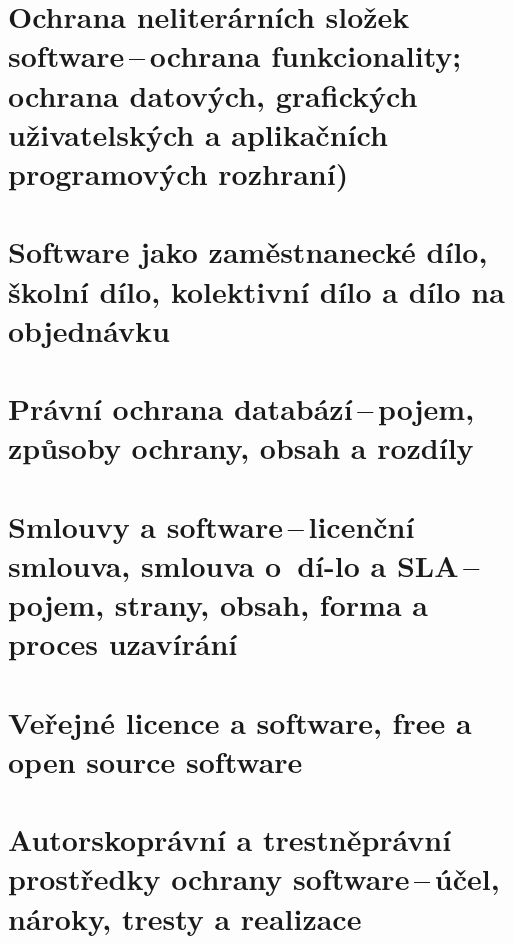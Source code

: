\newpage
\section{Ochrana neliterárních složek software\,--\,ochrana funkcionality; ochrana datových, grafických uživatelských a aplikačních programových rozhraní)}

\newpage
\section{Software jako zaměstnanecké dílo, školní dílo, kolektivní dílo a dílo na objednávku}

\newpage
\section{Právní ochrana databází\,--\,pojem, způsoby ochrany, obsah a rozdíly}

\newpage
\section[Smlouvy a software\,--\,licenční smlouva, smlouva o~dílo a SLA\,--\,pojem, strany, obsah, forma a proces uzavírání]{Smlouvy a software\,--\,licenční smlouva, smlouva o~dí-lo a SLA\,--\,pojem, strany, obsah, forma a proces uzavírání}

\newpage
\section{Veřejné licence a software, free a open source software}

\newpage
\section{Autorskoprávní a trestněprávní prostředky ochrany software\,--\,účel, nároky, tresty a realizace}

\newpage